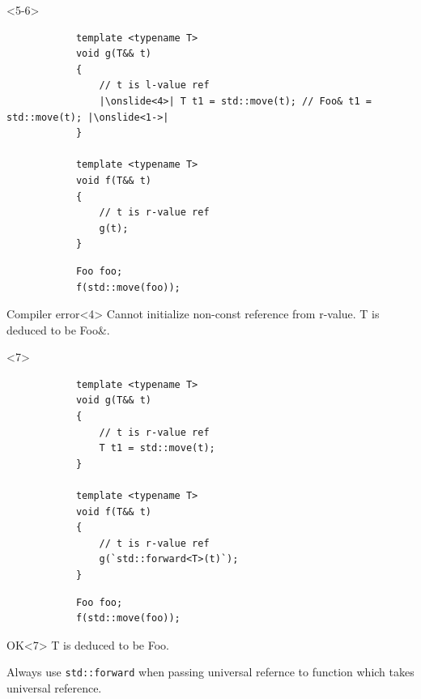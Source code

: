 \documentclass{beamer}
\begin{document}
\begin{frame}[fragile,t]
    \begin{onlyenv}<5-6>
        \begin{lstlisting}
            template <typename T>
            void g(T&& t)
            {
                // t is l-value ref
                |\onslide<4>| T t1 = std::move(t); // Foo& t1 = std::move(t); |\onslide<1->|
            }

            template <typename T>
            void f(T&& t)
            {
                // t is r-value ref
                g(t);
            }
        \end{lstlisting}

        \hrulefill
        \begin{lstlisting}
            Foo foo;
            f(std::move(foo));
        \end{lstlisting}
        \begin{alertblock}{Compiler error}<4>
            Cannot initialize non-const reference from r-value.
            T is deduced to be Foo\&.
        \end{alertblock}
    \end{onlyenv}

    \begin{onlyenv}<7>
        \begin{lstlisting}
            template <typename T>
            void g(T&& t)
            {
                // t is r-value ref
                T t1 = std::move(t);
            }

            template <typename T>
            void f(T&& t)
            {
                // t is r-value ref
                g(`std::forward<T>(t)`);
            }
        \end{lstlisting}

        \hrulefill
        \begin{lstlisting}
            Foo foo;
            f(std::move(foo));
        \end{lstlisting}

        \begin{block}{OK}<7>
            T is deduced to be Foo.
        \end{block}
    \end{onlyenv}
\end{frame}

\begin{frame}
    \begin{center}
        Always use \texttt{std::forward} when passing universal refernce to function which takes
        universal reference.
    \end{center}
\end{frame}
\end{document}
